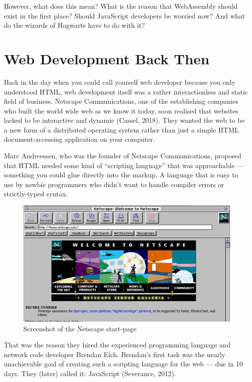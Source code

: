 \documentclass[11pt]{article}
\begin{document}
However, what does this mean? What is the reason that WebAssembly should exist in the first place? Should JavaScript developers be worried now? And what do the wizards of Hogwarts have to do with it?

\section{Web Development Back Then}
\label{sec:back-then}

Back in the day when you could call yourself web developer because you only understood HTML, web development itself was a rather interactionless and static field of business. Netscape Communications, one of the establishing companies who built the world wide web as we know it today, soon realised that websites lacked to be interactive and dynamic (Cassel, 2018). They wanted the web to be a new form of a distributed operating system rather than just a simple HTML document-accessing application on your computer.

Marc Andreessen, who was the founder of Netscape Communications, proposed that HTML needed some kind of “scripting language” that was approachable — something you could glue directly into the markup. A language that is easy to use by newbie programmers who didn’t want to handle compiler errors or strictly-typed syntax.

\begin{figure}[ht]
  \centering
  \includegraphics[width=\textwidth]{figures/002.jpg}
  \caption{Screenshot of the Netscape start-page \citep{npr_home_nodate}}
  \label{fig:netscape}
\end{figure}

That was the reason they hired the experienced programming language and network code developer Brendan Eich. Brendan’s first task was the nearly unachievable goal of creating such a scripting language for the web — due in 10 days. They (later) called it: JavaScript (Severance, 2012).

\pagebreak


\end{document}
